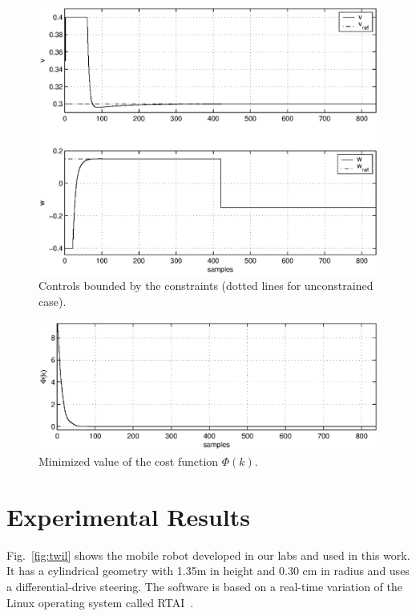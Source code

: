 \documentclass[conference]{IEEEtran} %
\begin{document}
\begin{figure}\begin{center}
    \includegraphics[width=.99\linewidth]{Figures/controls.eps}
    \caption{Controls bounded by the constraints (dotted lines for unconstrained case).}
    \label{fig:controls}
\end{center}\end{figure}
\begin{figure}\begin{center}
    \includegraphics[width=.99\linewidth]{Figures/cost.eps}
    \caption{Minimized value of the cost function $\Phi(k)$.}
    \label{fig:cost}
\end{center}\end{figure}


\section{Experimental Results}
\label{sec:exp}

Fig.~\ref{fig:twil} shows the mobile robot developed in our labs and used
in this work. It has a cylindrical geometry with 1.35m in
height and 0.30 cm in radius and uses a differential-drive steering. The
software is based on a real-time variation of the Linux operating system
called RTAI~\cite{Dozio:2003}.
\end{document}
